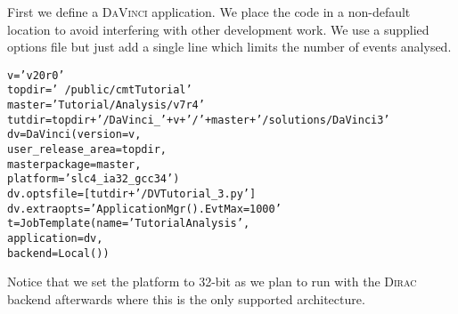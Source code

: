 \documentclass{howto}
\def\davinci {\textsc{DaVinci}\xspace}
\def\dirac {\textsc{Dirac}\xspace}
\def\davinciv {v20r0\xspace}
\def\tutorialv {v7r4\xspace}
\begin{document}
First we define a \davinci application. We place the code in a non-default
location to avoid interfering with other development work. We use a supplied
options file but just add a single line which limits the number of events
analysed.
\begin{alltt}
v = '\davinciv'
topdir='~/public/cmtTutorial'
master='Tutorial/Analysis/\tutorialv'
tutdir=topdir+'/DaVinci_'+v+'/'+master+'/solutions/DaVinci3'
dv = DaVinci(version=v,
             user_release_area=topdir, 
             masterpackage=master,
             platform='slc4_ia32_gcc34')
dv.optsfile=[tutdir+'/DVTutorial_3.py']
dv.extraopts='ApplicationMgr().EvtMax = 1000'
t = JobTemplate(name='TutorialAnalysis',
                application=dv, 
                backend=Local())
\end{alltt}
Notice that we set the platform to 32-bit as we plan to run with the \dirac
backend afterwards where this is the only supported architecture.
\end{document}
